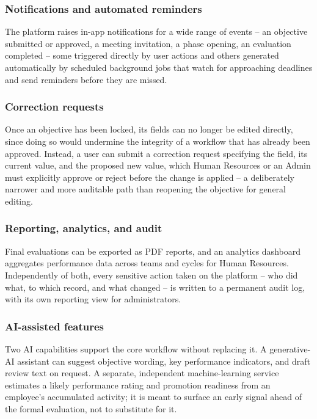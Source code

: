 \documentclass[12pt,a4paper]{report}
\begin{document}
\subsubsection{Notifications and automated reminders}

The platform raises in-app notifications for a wide range of events -- an objective submitted or approved, a meeting invitation, a phase opening, an evaluation completed -- some triggered directly by user actions and others generated automatically by scheduled background jobs that watch for approaching deadlines and send reminders before they are missed.

\subsubsection{Correction requests}

Once an objective has been locked, its fields can no longer be edited directly, since doing so would undermine the integrity of a workflow that has already been approved. Instead, a user can submit a correction request specifying the field, its current value, and the proposed new value, which Human Resources or an Admin must explicitly approve or reject before the change is applied -- a deliberately narrower and more auditable path than reopening the objective for general editing.

\subsubsection{Reporting, analytics, and audit}

Final evaluations can be exported as PDF reports, and an analytics dashboard aggregates performance data across teams and cycles for Human Resources. Independently of both, every sensitive action taken on the platform -- who did what, to which record, and what changed -- is written to a permanent audit log, with its own reporting view for administrators.

\subsubsection{AI-assisted features}

Two AI capabilities support the core workflow without replacing it. A generative-AI assistant can suggest objective wording, key performance indicators, and draft review text on request. A separate, independent machine-learning service estimates a likely performance rating and promotion readiness from an employee's accumulated activity; it is meant to surface an early signal ahead of the formal evaluation, not to substitute for it.
\end{document}
